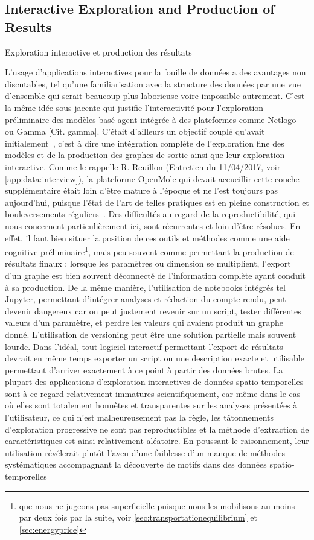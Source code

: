 \subsection{Interactive Exploration and Production of Results}{Exploration interactive et production des résultats}

L'usage d'applications interactives pour la fouille de données a des avantages non discutables, tel qu'une familiarisation avec la structure des données par une vue d'ensemble qui serait beaucoup plus laborieuse voire impossible autrement. C'est la même idée sous-jacente qui justifie l'interactivité pour l'exploration préliminaire des modèles basé-agent intégrée à des plateformes comme Netlogo~\cite{wilensky1999netlogo} ou Gamma [Cit. gamma]. C'était d'ailleurs un objectif couplé qu'avait initialement~\cite{rey2015plateforme}, c'est à dire une intégration complète de l'exploration fine des modèles et de la production des graphes de sortie ainsi que leur exploration interactive. Comme le rappelle R. Reuillon (Entretien du 11/04/2017, voir \ref{app:data:interview}), la plateforme OpenMole qui devait accueillir cette couche supplémentaire était loin d'être mature à l'époque et ne l'est toujours pas aujourd'hui, puisque l'état de l'art de telles pratiques est en pleine construction et bouleversements réguliers~\cite{holzinger2014knowledge}. Des difficultés au regard de la reproductibilité, qui nous concernent particulièrement ici, sont récurrentes et loin d'être résolues. En effet, il faut bien situer la position de ces outils et méthodes comme une aide cognitive préliminaire\footnote{que nous ne jugeons pas superficielle puisque nous les mobilisons au moins par deux fois par la suite, voir \ref{sec:transportationequilibrium} et \ref{sec:energyprice}}, mais peu souvent comme permettant la production de résultats finaux : lorsque les paramètres ou dimension se multiplient, l'export d'un graphe est bien souvent déconnecté de l'information complète ayant conduit à sa production. De la même manière, l'utilisation de notebooks intégrés tel Jupyter, permettant d'intégrer analyses et rédaction du compte-rendu, peut devenir dangereux car on peut justement revenir sur un script, tester différentes valeurs d'un paramètre, et perdre les valeurs qui avaient produit un graphe donné. L'utilisation de versioning peut être une solution partielle mais souvent lourde. Dans l'idéal, tout logiciel interactif permettant l'export de résultats devrait en même temps exporter un script ou une description exacte et utilisable permettant d'arriver exactement à ce point à partir des données brutes. La plupart des applications d'exploration interactives de données spatio-temporelles sont à ce regard relativement immatures scientifiquement, car même dans le cas où elles sont totalement honnêtes et transparentes sur les analyses présentées à l'utilisateur, ce qui n'est malheureusement pas la règle, les tâtonnements d'exploration progressive ne sont pas reproductibles et la méthode d'extraction de caractéristiques est ainsi relativement aléatoire. En poussant le raisonnement, leur utilisation révélerait plutôt l'aveu d'une faiblesse d'un manque de méthodes systématiques accompagnant la découverte de motifs dans des données spatio-temporelles 